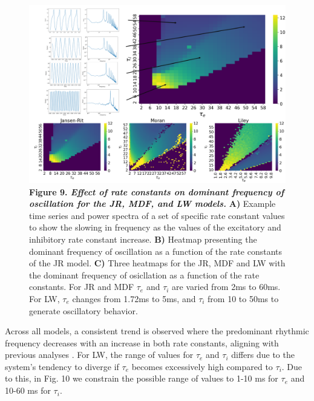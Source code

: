 \documentclass[12pt,twoside]{article}
\begin{document}
\begin{figure}[H]
    \centering
    \includegraphics[scale=0.4]{Images/Rate_constant_2.png}%
    \caption*{\textbf{Figure 9. \textit{Effect of rate constants on dominant frequency of oscillation for the JR, MDF, and LW models.}} 
    \textbf{A)} Example time series and power spectra of a set of specific rate constant values to show the slowing in frequency as the values of the excitatory and inhibitory rate constant increase. \textbf{B)} Heatmap presenting the dominant frequency of oscillation as a function of the rate constants of the JR model. \textbf{C)} Three heatmaps for the JR, MDF and LW with the dominant frequency of osicllation as a function of the rate constants. For JR and MDF $\tau_{e}$ and $\tau_{i}$ are varied from 2ms to 60ms. For LW, $\tau_{e}$ changes from 1.72ms to 5ms, and $\tau_{i}$ from 10 to 50ms to generate oscillatory behavior.}
    \label{fig:tau_param_sweep}
\end{figure}
Across all models, a consistent trend is observed where the predominant rhythmic frequency decreases with an increase in both rate constants, aligning with previous analyses \citep{david2003neural}. For LW, the range of values for $\tau_e$ and $\tau_i$ differs due to the system's tendency to diverge if $\tau_e$ becomes excessively high compared to $\tau_i$. Due to this, in Fig. 10 we constrain the possible range of values to 1-10 ms for $\tau_e$ and 10-60 ms for $\tau_i$.
\end{document}
